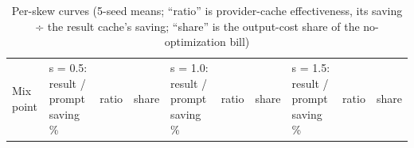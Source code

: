 \documentclass[
  11pt,
]{article}
\begin{document}
\begin{longtable}[]{@{}
  >{\raggedright\arraybackslash}p{}
  >{\raggedright\arraybackslash}p{}
  >{\raggedright\arraybackslash}p{}
  >{\raggedright\arraybackslash}p{}
  >{\raggedright\arraybackslash}p{}
  >{\raggedright\arraybackslash}p{}
  >{\raggedright\arraybackslash}p{}
  >{\raggedright\arraybackslash}p{}
  >{\raggedright\arraybackslash}p{}
  >{\raggedright\arraybackslash}p{}@{}}
\caption{Per-skew curves (5-seed means; ``ratio'' is provider-cache
effectiveness, its saving ÷ the result cache's saving; ``share'' is the
output-cost share of the no-optimization bill)}\tabularnewline
\toprule\noalign{}
\begin{minipage}[b]{\linewidth}\raggedright
Mix point
\end{minipage} & \begin{minipage}[b]{\linewidth}\raggedright
s = 0.5: result / prompt saving \%
\end{minipage} & \begin{minipage}[b]{\linewidth}\raggedright
ratio
\end{minipage} & \begin{minipage}[b]{\linewidth}\raggedright
share
\end{minipage} & \begin{minipage}[b]{\linewidth}\raggedright
s = 1.0: result / prompt saving \%
\end{minipage} & \begin{minipage}[b]{\linewidth}\raggedright
ratio
\end{minipage} & \begin{minipage}[b]{\linewidth}\raggedright
share
\end{minipage} & \begin{minipage}[b]{\linewidth}\raggedright
s = 1.5: result / prompt saving \%
\end{minipage} & \begin{minipage}[b]{\linewidth}\raggedright
ratio
\end{minipage} & \begin{minipage}[b]{\linewidth}\raggedright
share
\end{minipage} \\

\end{longtable}
\end{document}
